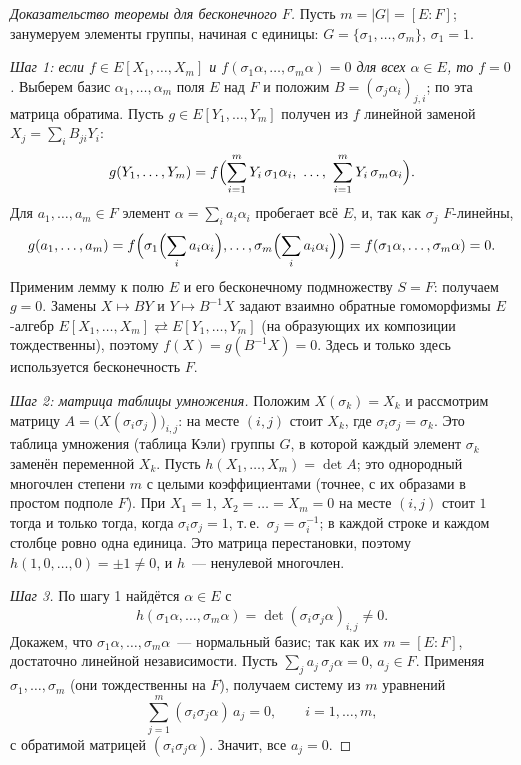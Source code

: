 \begin{proof}[Доказательство теоремы  для бесконечного $F$]
Пусть $m=|G|=[E:F]$; занумеруем элементы группы, начиная с единицы: $G=\{\sigma_1,\dots,\sigma_m\}$, ${\sigma_1=1}$.

\emph{Шаг 1: если $f\in E[X_1,\dots,X_m]$ и $f(\sigma_1\alpha,\dots,\sigma_m\alpha)=0$ для всех $\alpha\in E$, то
$f=0$.} Выберем базис $\alpha_1,\dots,\alpha_m$ поля $E$ над $F$ и положим $B=(\sigma_j\alpha_i)_{j,i}$; по  эта
матрица обратима. Пусть $g\in E[Y_1,\dots,Y_m]$ получен из $f$ линейной заменой $X_j=\sum_iB_{ji}Y_i$:
\[
g(Y_1,\dots,Y_m)=f\Bigl(\sum_{i=1}^mY_i\,\sigma_1\alpha_i,\ \dots,\ \sum_{i=1}^mY_i\,\sigma_m\alpha_i\Bigr).
\]
Для $a_1,\dots,a_m\in F$ элемент $\alpha=\sum_ia_i\alpha_i$ пробегает всё $E$, и, так как $\sigma_j$ $F$-линейны,
\[
g(a_1,\dots,a_m)=f\Bigl(\sigma_1\Bigl(\sum_ia_i\alpha_i\Bigr),\dots,\sigma_m\Bigl(\sum_ia_i\alpha_i\Bigr)\Bigr)
=f(\sigma_1\alpha,\dots,\sigma_m\alpha)=0.
\]
Применим лемму  к полю $E$ и его бесконечному подмножеству $S=F$: получаем $g=0$. Замены $X\mapsto BY$ и
$Y\mapsto B^{-1}X$ задают взаимно обратные гомоморфизмы $E$-алгебр $E[X_1,\dots,X_m]\rightleftarrows E[Y_1,\dots,Y_m]$
(на образующих их композиции тождественны), поэтому $f(X)=g(B^{-1}X)=0$. Здесь и только здесь используется
бесконечность $F$.

\emph{Шаг 2: матрица таблицы умножения.} Положим $X(\sigma_k)=X_k$ и рассмотрим матрицу $A=\bigl(X(\sigma_i\sigma_j)\bigr)_{i,j}$:
на месте $(i,j)$ стоит $X_k$, где $\sigma_i\sigma_j=\sigma_k$. Это таблица умножения (таблица Кэли) группы $G$, в которой
каждый элемент $\sigma_k$ заменён переменной $X_k$. Пусть $h(X_1,\dots,X_m)=\det A$; это однородный многочлен
степени $m$ с целыми коэффициентами (точнее, с их образами в простом подполе $F$). При $X_1=1$, $X_2=\dots=X_m=0$ на месте
$(i,j)$ стоит $1$ тогда и только тогда, когда $\sigma_i\sigma_j=1$, т.\,е.\ $\sigma_j=\sigma_i^{-1}$; в каждой строке и
каждом столбце ровно одна единица. Это матрица перестановки, поэтому $h(1,0,\dots,0)=\pm1\ne0$, и $h$~--- ненулевой
многочлен.

\emph{Шаг 3.} По шагу 1 найдётся $\alpha\in E$ с
\[
h(\sigma_1\alpha,\dots,\sigma_m\alpha)=\det(\sigma_i\sigma_j\alpha)_{i,j}\ne0.
\]
Докажем, что $\sigma_1\alpha,\dots,\sigma_m\alpha$~--- нормальный базис; так как их $m=[E:F]$, достаточно линейной
независимости. Пусть $\sum_ja_j\,\sigma_j\alpha=0$, $a_j\in F$. Применяя $\sigma_1,\dots,\sigma_m$ (они тождественны на
$F$), получаем систему из $m$ уравнений
\[
\sum_{j=1}^m(\sigma_i\sigma_j\alpha)\,a_j=0,\qquad i=1,\dots,m,
\]
с обратимой матрицей $(\sigma_i\sigma_j\alpha)$. Значит, все $a_j=0$.
\end{proof}

